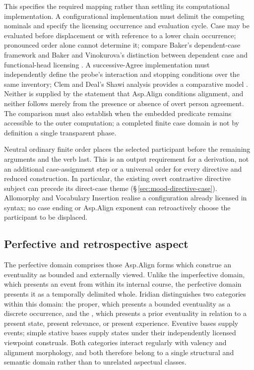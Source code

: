 This specifies the required mapping rather than settling its computational
implementation. A configurational implementation must delimit the competing
nominals and specify the licensing occurrence and evaluation cycle. Case may
be evaluated before displacement or with reference to a lower chain occurrence;
pronounced order alone cannot determine it; compare Baker's dependent-case framework and Baker and
Vinokurova's distinction between dependent case and functional-head licensing
\cite{baker2015,bakervinokurova2010}. A successive-Agree implementation must
independently define the probe's interaction and stopping conditions over the
same inventory; Clem and Deal's Shawi analysis provides a comparative model
\cite{clemdeal2026}. Neither
is supplied by the statement that Asp.Align conditions alignment, and neither
follows merely from the presence or absence of overt person agreement.
The comparison must also establish when the embedded predicate remains
accessible to the outer computation; a completed finite case domain is not
by definition a single transparent phase.

Neutral ordinary finite order places the selected participant before the
remaining arguments and the verb last. This is an output requirement for a
derivation, not an additional case-assignment step or a universal order for
every directive and reduced construction. In particular, the existing overt
contrastive directive subject can precede its direct-case theme
(§\,\ref{sec:mood-directive-case}). Allomorphy and Vocabulary Insertion
realise a configuration already licensed in syntax; no case ending or
Asp.Align exponent can retroactively choose the participant to be displaced.

\subsection{Perfective and retrospective aspect}\label{sec:aspect-pf}

The perfective domain comprises those Asp.Align forms which construe an
eventuality as bounded and externally viewed. Unlike the imperfective domain,
which presents an event from within its internal course, the perfective domain
presents it as a temporally delimited whole. Iridian distinguishes two
categories within this domain: the  proper, which presents a
bounded eventuality as a discrete occurrence, and the ,
which presents a prior eventuality in relation to a present state, present
relevance, or present experience. Eventive bases supply events; simple
stative bases supply states under their independently licensed viewpoint
construals. Both categories interact regularly with
valency and alignment morphology, and both therefore belong to a single
structural and semantic domain rather than to unrelated aspectual classes.

